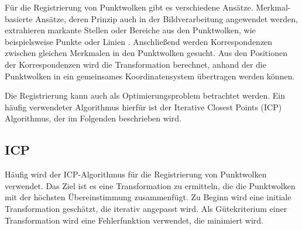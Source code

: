 

Für die Registrierung von Punktwolken gibt es verschiedene Ansätze. Merkmal-basierte Ansätze, deren Prinzip auch in der Bildverarbeitung angewendet werden, extrahieren markante  Stellen oder Bereiche aus den Punktwolken, wie beispielsweise Punkte oder Linien \cite{Simon1994}. Anschließend werden Korrespondenzen zwischen gleichen Merkmalen in den Punktwolken gesucht. Aus den Positionen der Korrespondenzen wird die Transformation berechnet, anhand der die Punktwolken in ein gemeinsames Koordinatensystem übertragen werden können. 

Die Registrierung kann auch als Optimierungsproblem betrachtet werden. Ein häufig verwendeter Algorithmus hierfür ist der Iterative Closest Points (ICP) Algorithmus, der im Folgenden beschrieben wird. 

\subsection[ICP (Kopp)]{ICP}

Häufig wird der ICP-Algorithmus für die Registrierung von Punktwolken verwendet. Das Ziel ist es eine Transformation zu ermitteln, die die Punktwolken mit der höchs\-ten Übereinstimmung zusammenfügt. Zu Beginn wird eine initiale Transformation geschätzt, die iterativ angepasst wird. Als Gütekriterium einer Transformation wird eine Fehlerfunktion verwendet, die minimiert wird. 

